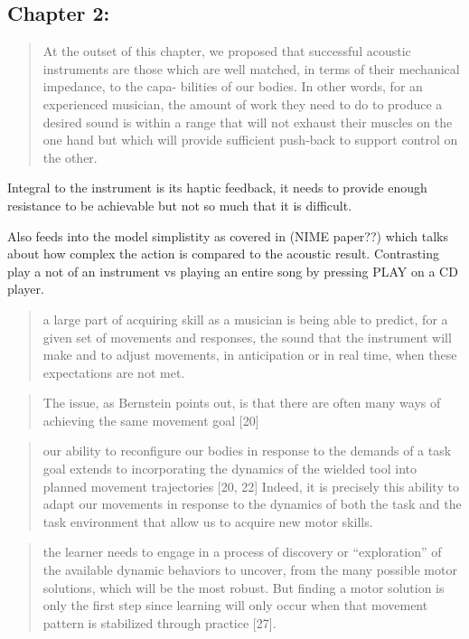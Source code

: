 \subsection{Chapter 2: \cite{omodhrain_once_2018}}


\begin{quotation}
    At the outset of this chapter, we proposed that successful acoustic instruments are those which are well matched, in terms of their mechanical impedance, to the capa- bilities of our bodies. In other words, for an experienced musician, the amount of work they need to do to produce a desired sound is within a range that will not exhaust their muscles on the one hand but which will provide sufficient push-back to support control on the other. 
\end{quotation}

Integral to the instrument is its haptic feedback, it needs to provide enough resistance to be achievable but not so much that it is difficult. 

Also feeds into the model simplistity as covered in (NIME paper??) which talks about how complex the action is compared to the acoustic result. Contrasting play a not of an instrument vs playing an entire song by pressing PLAY on a CD player.

\begin{quotation}
    a large part of acquiring skill as a musician is being able to predict, for a given set of movements and responses, the sound that the instrument will make and to adjust movements, in anticipation or in real time, when these expectations are not met.
\end{quotation}


\begin{quotation}
The issue, as Bernstein points out, is that there are often many ways of achieving the same movement goal [20]
\end{quotation}

\begin{quotation}
    our ability to reconfigure our bodies in response to the demands of a task goal extends to incorporating the dynamics of the wielded tool into planned movement trajectories [20, 22]
    Indeed, it is precisely this ability to adapt our movements in response to the dynamics of both the task and the task environment that allow us to acquire new motor skills.
\end{quotation}

\begin{quotation}
    the learner needs to engage in a process of discovery or “exploration” of the available dynamic behaviors to uncover, from the many possible motor solutions, which will be the most robust. But finding a motor solution is only the first step since learning will only occur when that movement pattern is stabilized through practice [27].
\end{quotation}

